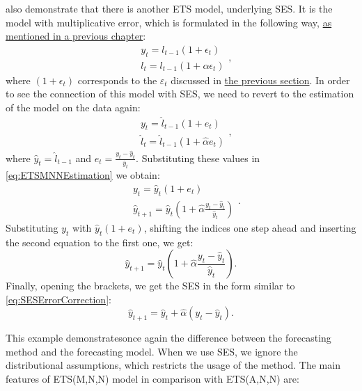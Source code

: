 \documentclass[
]{book}
\theoremstyle{definition}
\theoremstyle{definition}
\theoremstyle{definition}
\theoremstyle{definition}
\theoremstyle{remark}
\begin{document}
\citet{Hyndman2008b} also demonstrate that there is another ETS model, underlying SES. It is the model with multiplicative error, which is formulated in the following way, \protect\hyperlink{ETSTaxonomyMaths}{as mentioned in a previous chapter}:
\begin{equation}
  \begin{aligned}
    & y_{t} = l_{t-1}(1 + \epsilon_t) \\
    & l_t = l_{t-1}(1 + \alpha \epsilon_t)
  \end{aligned} ,
  \label{eq:ETSMNN}
\end{equation}
where \((1+\epsilon_t)\) corresponds to the \(\varepsilon_t\) discussed in \protect\hyperlink{tsComponents}{the previous section}. In order to see the connection of this model with SES, we need to revert to the estimation of the model on the data again:
\begin{equation}
  \begin{aligned}
    & y_{t} = \hat{l}_{t-1}(1 + e_t) \\
    & \hat{l}_t = \hat{l}_{t-1}(1 + \hat{\alpha} e_t)
  \end{aligned} ,
  \label{eq:ETSMNNEstimation}
\end{equation}
where \(\hat{y}_t = \hat{l}_{t-1}\) and \(e_t=\frac{y_t - \hat{y}_t}{\hat{y}_t}\). Substituting these values in \eqref{eq:ETSMNNEstimation} we obtain:
\begin{equation}
  \begin{aligned}
    & y_{t} = \hat{y}_t (1 + e_t) \\
    & \hat{y}_{t+1} = \hat{y}_t \left(1 + \hat{\alpha} \frac{y_t - \hat{y}_t}{\hat{y}_t} \right)
  \end{aligned} .
  \label{eq:ETSMNNEstimation2}
\end{equation}
Substituting \(y_t\) with \(\hat{y}_t(1+e_t)\), shifting the indices one step ahead and inserting the second equation to the first one, we get:
\begin{equation}
    \hat{y}_{t+1} = \hat{y}_t \left(1 + \hat{\alpha} \frac{y_t - \hat{y}_t}{\hat{y}_t} \right).
  \label{eq:ETSMNNEstimation3}
\end{equation}
Finally, opening the brackets, we get the SES in the form similar to \eqref{eq:SESErrorCorrection}:
\begin{equation}
    \hat{y}_{t+1} = \hat{y}_t + \hat{\alpha} (y_t - \hat{y}_t).
  \label{eq:ETSMNNEstimation4}
\end{equation}

This example demonstratesonce again the difference between the forecasting method and the forecasting model. When we use SES, we ignore the distributional assumptions, which restricts the usage of the method. The main features of ETS(M,N,N) model in comparison with ETS(A,N,N) are:
\end{document}
